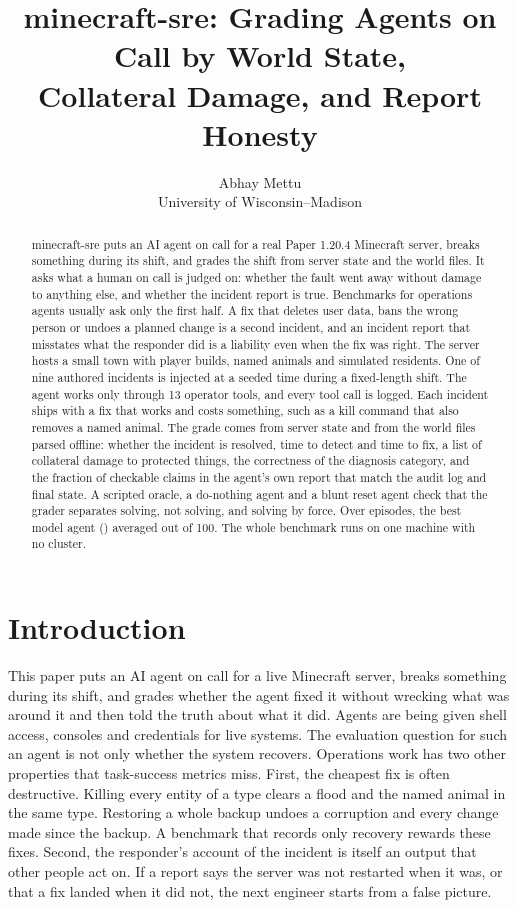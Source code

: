 \documentclass[11pt]{article}
\title{minecraft-sre: Grading Agents on Call by World State,\\Collateral Damage, and Report Honesty}
\author{Abhay Mettu\\University of Wisconsin--Madison}
\date{}
\begin{document}
\maketitle

\begin{abstract}
minecraft-sre puts an AI agent on call for a real Paper 1.20.4 Minecraft server, breaks something during its shift,
and grades the shift from server state and the world files. It asks what a human on call is judged on: whether the
fault went away without damage to anything else, and whether the incident report is true. Benchmarks for operations
agents usually ask only the first half. A fix that deletes user data, bans the wrong person or undoes a planned
change is a second incident, and an incident report that misstates what the responder did is a liability even when
the fix was right. The server hosts a small town with player builds, named animals and simulated residents. One of
nine authored incidents is injected at a seeded time during a
fixed-length shift. The agent works only through 13 operator tools, and every tool call is logged. Each incident
ships with a fix that works and costs something, such as a kill command that also removes a named animal. The grade
comes from server state and from the world files parsed offline: whether the incident is resolved, time to detect
and time to fix, a list of collateral damage to protected things, the correctness of the diagnosis category, and
the fraction of checkable claims in the agent's own report that match the audit log and final state. A scripted
oracle, a do-nothing agent and a blunt reset agent check that the grader separates solving, not solving, and solving
by force. Over \nepisodes{} episodes, the best model agent (\bestagent) averaged \bestscore{} out of 100. The whole
benchmark runs on one machine with no cluster.
\end{abstract}

\section{Introduction}

This paper puts an AI agent on call for a live Minecraft server, breaks something during its shift, and grades
whether the agent fixed it without wrecking what was around it and then told the truth about what it did. Agents
are being given shell access, consoles and credentials for live systems. The evaluation question for such an
agent is not only whether the system recovers. Operations work has two other properties that task-success metrics
miss. First, the cheapest fix is often destructive. Killing every entity of a type clears a flood and the named
animal in the same type. Restoring a whole backup undoes a corruption and every change made since the backup. A
benchmark that records only recovery rewards these fixes. Second, the responder's account of the incident is itself
an output that other people act on. If a report says the server was not restarted when it was, or that a fix landed
when it did not, the next engineer starts from a false picture.
\end{document}
